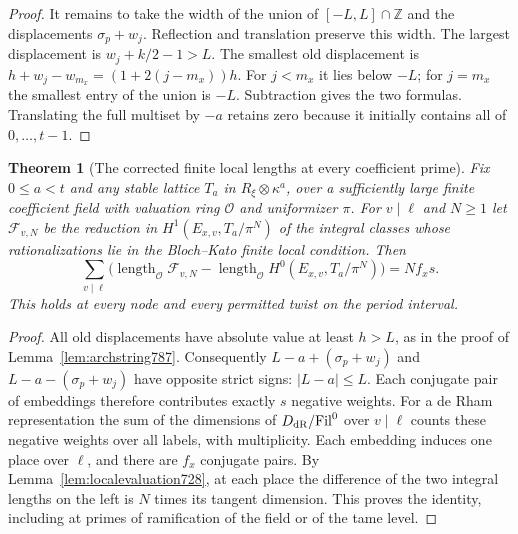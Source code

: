 \documentclass[a4paper,11pt]{article}
\newtheorem{theorem}[proposition]{Theorem}
\theoremstyle{definition}
\theoremstyle{remark}
\newcommand{\ZZ}{\mathbb Z}\newcommand{\ord}{\operatorname{ord}}
\numberwithin{equation}{section}
\begin{document}
\begin{proof}
It remains to take the width of the union of
\([-L,L]\cap\ZZ\) and the displacements \(\sigma_p+w_j\).
Reflection and translation preserve this width.
The largest displacement is \(w_j+k/2-1>L\).
The smallest old displacement is \(h+w_j-w_{m_x}
=(1+2(j-m_x))h\). For \(j<m_x\) it lies below \(-L\);
for \(j=m_x\) the smallest entry of the union is \(-L\).
Subtraction gives the two formulas. Translating the
full multiset by \(-a\) retains zero because it
initially contains all of \(0,\ldots,t-1\).
\end{proof}

\begin{theorem}[The corrected finite local lengths at every coefficient prime]
\leavevmode\label{thm:highfinite788}
Fix \(0\le a<t\) and any stable lattice \(T_a\) in
\(R_\xi\otimes\kappa^a\), over a sufficiently large
finite coefficient field with valuation ring \(\mathcal O\)
and uniformizer \(\pi\). For \(v\mid\ell\) and \(N\ge1\)
let \(\mathcal F_{v,N}\) be the reduction in
\(H^1(E_{x,v},T_a/\pi^N)\) of the integral classes whose
rationalizations lie in the Bloch--Kato finite local
condition. Then
\[
 \sum_{v\mid\ell}
 \bigl(\operatorname{length}_{\mathcal O}\mathcal F_{v,N}
    -\operatorname{length}_{\mathcal O}
                 H^0(E_{x,v},T_a/\pi^N)\bigr)
                  =N f_x s .
\]
This holds at every node and every permitted twist on
the period interval.
\end{theorem}
\begin{proof}
All old displacements have absolute value at least
\(h>L\), as in the proof of Lemma~\ref{lem:archstring787}.
Consequently \(L-a+(\sigma_p+w_j)\) and
\(L-a-(\sigma_p+w_j)\) have opposite strict signs:
\(|L-a|\le L\). Each conjugate pair of embeddings
therefore contributes exactly \(s\) negative weights.
For a de Rham representation the sum of the dimensions
of \(D_{\rm dR}/\mathrm{Fil}^0\) over \(v\mid\ell\)
counts these negative weights over all labels, with
multiplicity. Each embedding induces one place over
\(\ell\), and there are \(f_x\) conjugate pairs.
By Lemma~\ref{lem:localevaluation728}, at each place
the difference of the two integral lengths on the
left is \(N\) times its tangent dimension. This proves
the identity, including at primes of ramification of
the field or of the tame level.
\end{proof}
\end{document}
